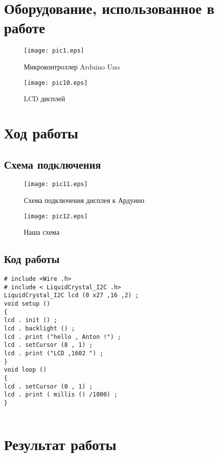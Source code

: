 \documentclass[12pt,a4paper]{scrartcl}
\begin{document}
 	\newpage
 
\section{Оборудование, использованное в работе}
\begin{figure}[h!]  
	\centering
	\texttt{[image: pic1.eps]} %
	\caption{Микроконтроллер Arduino Uno} 
	\label{image:pic1} %
\end{figure}	
\begin{figure}[h!]  
	\centering
	\texttt{[image: pic10.eps]} %
	\caption{LCD дисплей} 
	\label{image:pic10} %
\end{figure}
  \newpage
  \section{Ход работы}
  \subsection{Схема подключения}
  
  \begin{figure}[h!]  
  	\centering
  	\texttt{[image: pic11.eps]} %
  	\caption{Схема подключения дисплея к Ардуино} 
  	\label{image:pic11}
  \end{figure}

 \begin{figure}[h!]  
	\centering
	\texttt{[image: pic12.eps]} %
	\caption{Наша схема} 
	\label{image:pic12}
\end{figure}
  \subsection{Код работы}
 \begin{verbatim}
# include <Wire .h> 
# include < LiquidCrystal_I2C .h> 
LiquidCrystal_I2C lcd (0 x27 ,16 ,2) ;
void setup () 
{ 
lcd . init () ; 
lcd . backlight () ;
lcd . print ("hello , Anton !") ; 
lcd . setCursor (8 , 1) ; 
lcd . print ("LCD ,1602 ") ; 
} 
void loop () 
{ 
lcd . setCursor (0 , 1) ; 
lcd . print ( millis () /1000) ; 
}


 \end{verbatim}

\section{Результат работы}
\end{document}

